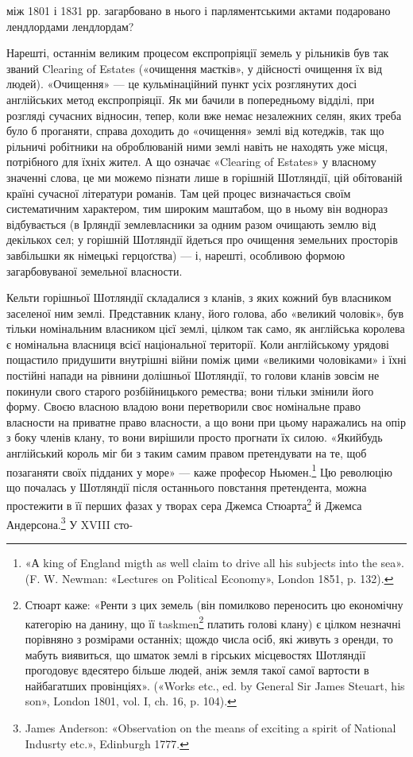 між 1801 і 1831 рр. загарбовано в нього і парляментськими актами подаровано лендлордами лендлордам?

Нарешті, останнім великим процесом експропріяції земель у рільників був так званий Clearing of
Estates («очищення маєтків», у дійсності очищення їх від людей). «Очищення» — це кульмінаційний
пункт усіх розглянутих досі англійських метод експропріяції. Як ми бачили в попередньому відділі,
при розгляді сучасних відносин, тепер, коли вже немає незалежних селян, яких треба було б проганяти,
справа доходить до «очищення» землі від котеджів, так що рільничі робітники на оброблюваній ними
землі навіть не находять уже місця, потрібного для їхніх жител. А що означає «Clearing of Estates» у
власному значенні слова, це ми можемо пізнати лише в горішній Шотляндії, цій обітованій країні
сучасної літератури романів. Там цей процес
визначається своїм систематичним характером, тим широким маштабом, що в ньому він воднораз
відбувається (в Ірляндії землевласники за одним разом очищають землю від декількох сел; у горішній
Шотляндії йдеться про очищення земельних просторів
завбільшки як німецькі герцоґства) — і, нарешті, особливою формою загарбовуваної земельної
власности.

Кельти горішньої Шотляндії складалися з кланів, з яких кожний був власником заселеної ним землі.
Представник клану, його голова, або «великий чоловік», був тільки номінальним власником цієї землі,
цілком так само, як англійська королева є номінальна власниця всієї національної території. Коли
англійському урядові пощастило придушити внутрішні війни поміж цими «великими чоловіками» і їхні
постійні напади на рівнини долішньої Шотляндії, то голови кланів зовсім не покинули свого старого
розбійницького ремества; вони тільки змінили його форму. Своєю власною владою вони перетворили своє
номінальне право власности на приватне право власности, а що вони при цьому наражались на опір з
боку членів клану, то вони вирішили просто прогнати їх силою. «Якийбудь англійський король міг би з
таким самим правом претендувати на те, щоб позаганяти своїх підданих у море» — каже професор
Ньюмен.\footnote{
«А king of England migth as well claim to drive all his subjects into the sea». (F. W. Newman:
«Lectures on Political Economy», London 1851, p. 132).
} Цю революцію що почалась у Шотляндії після останнього повстання претендента, можна
простежити в її перших фазах у творах сера Джемса Стюарта\footnote{
Стюарт каже: «Ренти з цих земель (він помилково переносить цю економічну категорію на данину, що
її taskmen\footnote*{
— васаль. Ред.
} платить голові клану) є цілком незначні порівняно з розмірами останніх; щождо числа
осіб, які живуть з оренди, то мабуть виявиться, що шматок землі в гірських місцевостях Шотляндії
прогодовує вдесятеро більше людей, аніж земля такої самої вартости в найбагатших провінціях».
(«Works etc., ed. by General Sir James Steuart, his son», London 1801, vol. I, ch. 16, p. 104).
} й Джемса Андерсона.\footnote{
James Anderson: «Observation on the means of exciting a spirit of National Indusrty etc.»,
Edinburgh 1777.
} У XVIII сто-